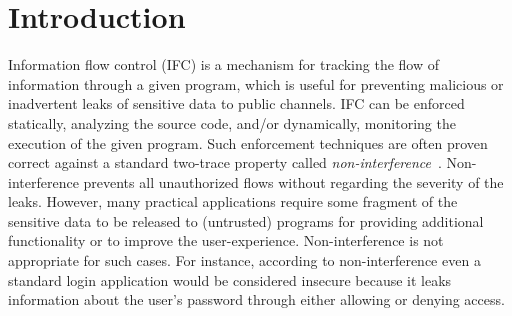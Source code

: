 

\section{Introduction}

Information flow control (IFC) is a mechanism for tracking the flow
of information through a given program, which is useful for preventing
malicious or inadvertent leaks of sensitive data to public
channels. IFC can be enforced statically, analyzing the source code,
and/or dynamically, monitoring the execution of the given
program. Such enforcement techniques are often proven 
correct against a standard two-trace property called
\emph{non-interference}~\cite{goguen}.  Non-interference prevents
all unauthorized flows without regarding the severity of the
leaks. However, many 
practical applications require some fragment of the sensitive
data to be released to (untrusted) programs for providing additional
functionality or to improve the user-experience. Non-interference is
not appropriate for such cases. For instance, according to 
non-interference even a standard login application would be considered
insecure because it leaks information about the user's password through
either allowing or denying access. 

